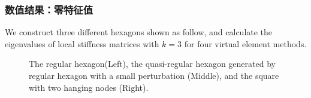 \documentclass[notheorems,serif]{beamer}
\begin{document}
\begin{frame}
    \frametitle{数值结果：零特征值}
We construct three different hexagons shown as follow, and calculate the
eigenvalues of local stiffness matrices with $k=3$ for four virtual element
methods. 
\begin{figure}[htbp]
\;\;%
{}
\;\;%
{}
\caption{The regular hexagon(Left), the quasi-regular hexagon generated by regular
    hexagon with a small perturbation (Middle), 
and the square with two hanging nodes (Right).}
\end{figure}
\end{frame}
\end{document}
